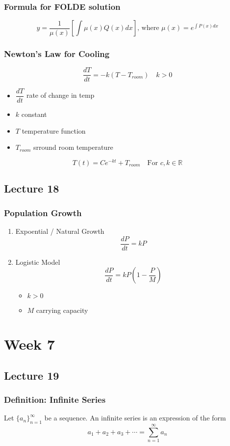 \documentclass[12pt, letterpaper]{article}
\begin{document}
\subsubsection{Formula for FOLDE solution}
\[y = \frac{1}{\mu(x)}[\int\mu(x)Q(x)dx]\text{, where } \mu(x) = e^{\int P(x)dx}\]
\subsubsection{Newton's Law for Cooling}
\[\frac{dT}{dt} = -k(T-T_{room}) \quad k>0\]
\begin{itemize}
    \item $\dfrac{dT}{dt}$ rate of change in temp
    \item $k$ constant 
    \item $T$ temperature function 
    \item $T_{room}$ srround room temperature
\end{itemize}
\[T(t) = Ce^{-kt} + T_{room} \quad \text{For $c,k\in\mathbb{R}$}\]
\subsection{Lecture 18}
\subsubsection{Population Growth}
\begin{enumerate}
    \item Expoential / Natural Growth 
    \[\frac{dP}{dt} = kP\]
    \item Logistic Model
    \[\frac{dP}{dt} = kP(1-\frac{P}{M})\]
    \begin{itemize}
        \item $k>0$
        \item $M$ carrying capacity
    \end{itemize}
\end{enumerate}

\section{Week 7}
\subsection{Lecture 19}
\subsubsection{Definition: Infinite Series}
Let $\{a_n\}_{n=1}^\infty$ be a sequence. An infinite series is an expression of the form 
\[a_1 + a_2 + a_3 + \cdots = \sum_{n=1}^{\infty}a_n\]
\end{document}
